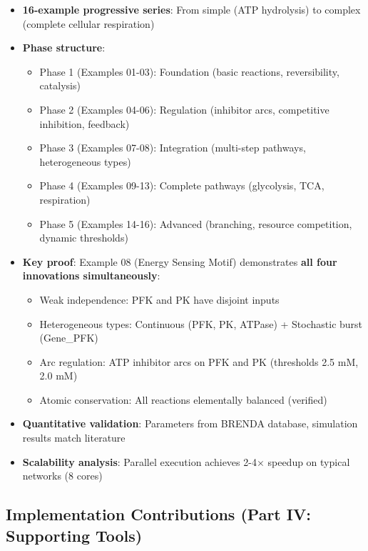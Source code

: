 \begin{itemize}
    \item \textbf{16-example progressive series}: From simple (ATP hydrolysis) to complex (complete cellular respiration)
    \item \textbf{Phase structure}:
    \begin{itemize}
        \item Phase 1 (Examples 01-03): Foundation (basic reactions, reversibility, catalysis)
        \item Phase 2 (Examples 04-06): Regulation (inhibitor arcs, competitive inhibition, feedback)
        \item Phase 3 (Examples 07-08): Integration (multi-step pathways, heterogeneous types)
        \item Phase 4 (Examples 09-13): Complete pathways (glycolysis, TCA, respiration)
        \item Phase 5 (Examples 14-16): Advanced (branching, resource competition, dynamic thresholds)
    \end{itemize}
    \item \textbf{Key proof}: Example 08 (Energy Sensing Motif) demonstrates \textbf{all four innovations simultaneously}:
    \begin{itemize}
        \item Weak independence: PFK and PK have disjoint inputs
        \item Heterogeneous types: Continuous (PFK, PK, ATPase) + Stochastic burst (Gene\_PFK)
        \item Arc regulation: ATP inhibitor arcs on PFK and PK (thresholds 2.5 mM, 2.0 mM)
        \item Atomic conservation: All reactions elementally balanced (verified)
    \end{itemize}
    \item \textbf{Quantitative validation}: Parameters from BRENDA database, simulation results match literature
    \item \textbf{Scalability analysis}: Parallel execution achieves 2-4$\times$ speedup on typical networks (8 cores)
\end{itemize}

\subsection{Implementation Contributions (Part IV: Supporting Tools)}
\label{subsec:implementation-contributions}

